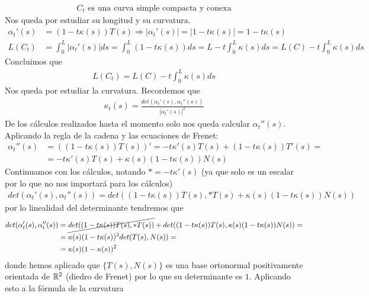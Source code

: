 \begin{ejercicio}
\begin{solucion}
        \begin{gather*}
            \boxed{C_t \text{ es una curva simple compacta y conexa}}
        \end{gather*}
        Nos queda por estudiar su longitud y su curvatura.
        \begin{align*}
            \alpha_t'(s) &= (1-t\kappa(s))T(s) \Rightarrow |\alpha_t'(s)| = |1-t\kappa(s)| = 1-t\kappa(s)\\[1.25em]
            L(C_t) &= \int_0^L |\alpha_t'(s)| ds = \int_0^L (1-t\kappa(s))ds = L - t\int_0^L\kappa(s) ds = L(C) - t\int_0^L \kappa(s) ds
        \end{align*}
        Concluimos que 
        \begin{gather*}
            \boxed{L(C_t) = L(C) - t\int_0^L \kappa(s) ds}
        \end{gather*}
        Nos queda por estudiar la curvatura. Recordemos que 
        \begin{gather*}
            \kappa_t(s) = \frac{det(\alpha_t'(s), \alpha_t''(s))}{|\alpha_t'(s)|^3}
        \end{gather*}
        De los cálculos realizados hasta el momento solo nos queda calcular $\alpha_t''(s)$. Aplicando la regla de la cadena y las ecuaciones de Frenet:
        \begin{align*}
            \alpha_t''(s) &= ((1-t\kappa(s))T(s))' = -t\kappa'(s)T(s) + (1-t\kappa(s))T'(s) = \\
            &= -t\kappa'(s)T(s) + \kappa(s)(1-t\kappa(s))N(s)
        \end{align*}
        Continuamos con los cálculos, notando $\ast = -t\kappa'(s)$ (ya que solo es un escalar por lo que no nos importará para los cálculos)
        \begin{gather*}
            det(\alpha_t'(s),\alpha_t''(s)) = det((1-t\kappa(s))T(s), \ast T(s) + \kappa(s)(1-t\kappa(s))N(s))
        \end{gather*}
        por lo linealidad del determinante tendremos que 
        \begin{align*}
            det(\alpha_t'(s),\alpha_t''(s)) &= \cancel{det((1-t\kappa(s))T(s), \ast T(s) )} + det((1-t\kappa(s))T(s), \kappa(s)(1-t\kappa(s))N(s)) =\\
            &= \kappa(s)(1-t\kappa(s))^2det(T(s),N(s)) =\\
            &= \kappa(s)(1-\kappa(s))^2
        \end{align*}
        donde hemos aplicado que $\{T(s), N(s)\}$ es una base ortonormal positivamente orientada de $\mathbb{R}^2$ (diedro de Frenet) por lo que su determinante es $1$. Aplicando esto a la fórmula de la curvatura

\end{solucion}
\end{ejercicio}
